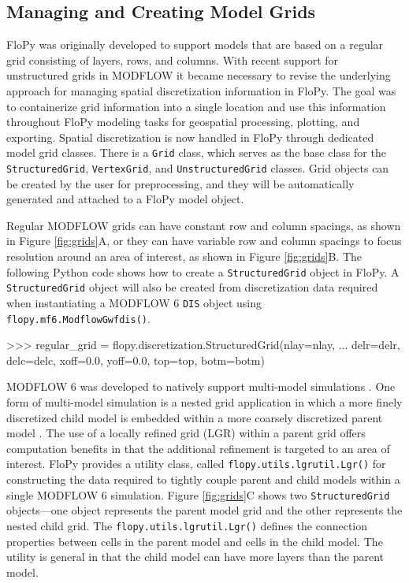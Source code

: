 \documentclass[11pt, oneside]{article}   	%
\begin{document}
\subsection{Managing and Creating Model Grids}

FloPy was originally developed to support models that are based on a regular grid consisting of layers, rows, and columns.  With recent support for unstructured grids in MODFLOW  \citep{modflowusg, modflow6gwf} it became necessary to revise the underlying approach for managing spatial discretization information in FloPy.  The goal was to containerize grid information into a single location and use this information throughout FloPy modeling tasks for geospatial processing, plotting, and exporting.  Spatial discretization is now handled in FloPy through dedicated model grid classes.  There is a \texttt{Grid} class, which serves as the base class for the \texttt{StructuredGrid}, \texttt{VertexGrid}, and \texttt{UnstructuredGrid} classes.  Grid objects can be created by the user for preprocessing, and they will be automatically generated and attached to a FloPy model object.

Regular MODFLOW grids can have constant row and column spacings, as shown in Figure \ref{fig:grids}A, or they can have variable row and column spacings to focus resolution around an area of interest, as shown in Figure \ref{fig:grids}B.  The following Python code shows how to create a \texttt{StructuredGrid} object in FloPy.  A \texttt{StructuredGrid} object will also be created from discretization data required when instantiating a MODFLOW 6 \texttt{DIS} object using \texttt{flopy.mf6.ModflowGwfdis()}.  

\begin{python}
>>> regular_grid = flopy.discretization.StructuredGrid(nlay=nlay, 
... delr=delr, delc=delc, xoff=0.0, yoff=0.0, top=top, botm=botm)
\end{python}

MODFLOW 6 was developed to natively support multi-model simulations \citep{modflow6framework}. One form of multi-model simulation is a nested grid application in which a more finely discretized child model is embedded within a more coarsely discretized parent model \citep{modflowlgr, vilhelmsen2012evaluation, modflowlgr2}.  The use of a locally refined grid (LGR) within a parent grid offers computation benefits in that the additional refinement is targeted to an area of interest.  FloPy provides a utility class, called \texttt{flopy.utils.lgrutil.Lgr()} for constructing the data required to tightly couple parent and child models within a single MODFLOW 6 simulation.   Figure \ref{fig:grids}C shows two \texttt{StructuredGrid} objects---one object represents the parent model grid and the other represents the nested child grid.  The \texttt{flopy.utils.lgrutil.Lgr()} defines the connection properties between cells in the parent model and cells in the child model.  The utility is general in that the child model can have more layers than the parent model.
\end{document}
